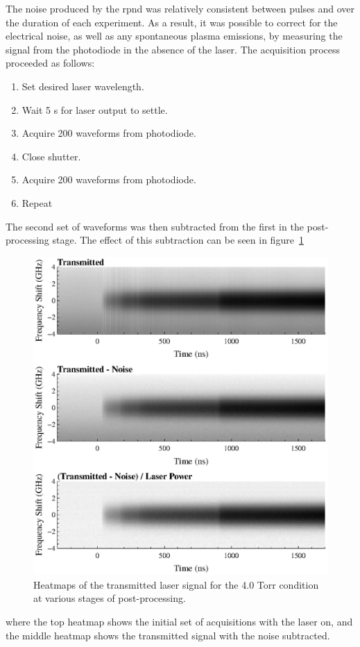 The noise produced by the \acs{rpnd} was relatively consistent between pulses
and over the duration of each experiment. As a result, it was possible to
correct for the electrical noise, as well as any spontaneous plasma emissions,
by measuring the signal from the photodiode in the absence of the laser. The
acquisition process proceeded as follows:
\begin{enumerate}
  \item Set desired laser wavelength.
  \item Wait 5 s for laser output to settle.
  \item Acquire 200 waveforms from photodiode.
  \item Close shutter.
  \item Acquire 200 waveforms from photodiode.
  \item Repeat
\end{enumerate}
The second set of waveforms was then subtracted from the first in the
post-processing stage. The effect of this subtraction can be seen in
figure~\ref{fig:contours}
\begin{figure}
  \centering
  \includegraphics{./chapters/metastables/figures/contours.eps}
  \caption{Heatmaps of the transmitted laser signal for the 4.0 Torr condition at 
  various stages of post-processing.}
  \label{fig:contours}
\end{figure}
where the top heatmap shows the initial set of acquisitions with the laser on,
and the middle heatmap shows the transmitted signal with the noise subtracted.

